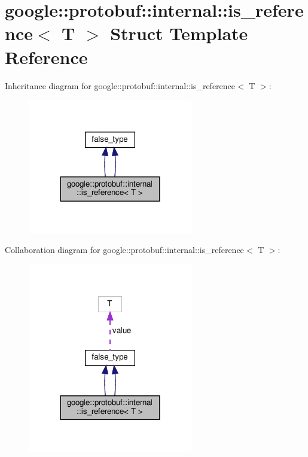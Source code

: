 \hypertarget{structgoogle_1_1protobuf_1_1internal_1_1is__reference}{}\section{google\+:\+:protobuf\+:\+:internal\+:\+:is\+\_\+reference$<$ T $>$ Struct Template Reference}
\label{structgoogle_1_1protobuf_1_1internal_1_1is__reference}


Inheritance diagram for google\+:\+:protobuf\+:\+:internal\+:\+:is\+\_\+reference$<$ T $>$\+:
\nopagebreak
\begin{figure}[H]
\begin{center}
\leavevmode
\includegraphics[width=204pt]{structgoogle_1_1protobuf_1_1internal_1_1is__reference__inherit__graph}
\end{center}
\end{figure}


Collaboration diagram for google\+:\+:protobuf\+:\+:internal\+:\+:is\+\_\+reference$<$ T $>$\+:
\nopagebreak
\begin{figure}[H]
\begin{center}
\leavevmode
\includegraphics[width=204pt]{structgoogle_1_1protobuf_1_1internal_1_1is__reference__coll__graph}
\end{center}
\end{figure}
